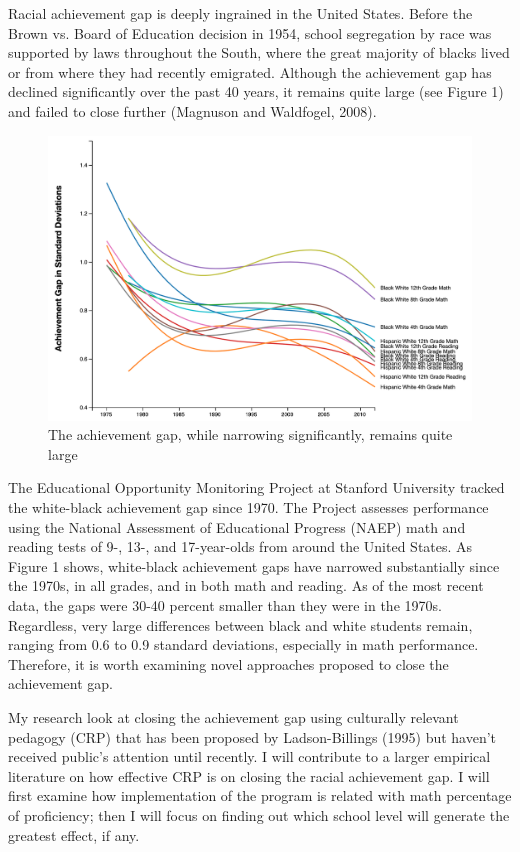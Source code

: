 \noindent Racial achievement gap is deeply ingrained in the United States. Before the Brown vs. Board of Education decision in 1954, school segregation by race was supported by laws throughout the South, where the great majority of blacks lived or from where they had recently emigrated. Although the achievement gap has declined significantly over the past 40 years, it remains quite large (see Figure 1) and failed to close further (Magnuson and Waldfogel, 2008). 
 
\begin{figure}[H]
  \includegraphics[width=\linewidth]{f1.png}
  \caption{The achievement gap, while narrowing significantly, remains quite large}
  \label{fig:boat1}
\end{figure}

\noindent The Educational Opportunity Monitoring Project at Stanford University tracked the white-black achievement gap since 1970. The Project assesses performance using the National Assessment of Educational Progress (NAEP) math and reading tests of 9-, 13-, and 17-year-olds from around the United States. As Figure 1 shows, white-black achievement gaps have narrowed substantially since the 1970s, in all grades, and in both math and reading. As of the most recent data, the gaps were 30-40 percent smaller than they were in the 1970s. Regardless, very large differences between black and white students remain, ranging from 0.6 to 0.9 standard deviations, especially in math performance. Therefore, it is worth examining novel approaches proposed to close the achievement gap.

My research look at closing the achievement gap using culturally relevant pedagogy (CRP) that has been proposed by Ladson-Billings (1995) but haven't received public's attention until recently. I will contribute to a larger empirical literature on how effective CRP is on closing the racial achievement gap. I will first examine how implementation of the program is related with math percentage of proficiency; then I will focus on finding out which school level will generate the greatest effect, if any. 

